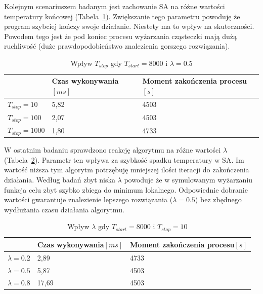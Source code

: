 Kolejnym scenariuszem badanym jest zachowanie SA na różne wartości temperatury końcowej (Tabela~\ref{tstop_sa}). Zwiększanie tego parametru powoduję że program  szybciej kończy swoje działanie. Niestety ma to wpływ na skuteczności. Powodem tego jest że pod koniec procesu wyżarzania cząsteczki mają dużą ruchliwość (duże prawdopodobieństwo znalezienia gorszego rozwiązania).
\begin{table}[H]
	\centering
	\label{tstop_sa}
	\caption{Wpływ $T_{stop}$ gdy $T_{start}=8000$ i $\lambda=0.5$}
	\begin{tabular}{lll}
		\toprule
		                & Czas wykonywania$[ms]$ & Moment zakończenia procesu$[s]$ \\
		\midrule
		$T_{stop}=10$   & 5,82                   & 4503                             \\
		$T_{stop}=100$  & 2,07                   & 4503                             \\
		$T_{stop}=1000$ & 1,80                   & 4733                             \\
		\bottomrule
	\end{tabular}
\end{table}

\newpage
W ostatnim badaniu sprawdzono reakcję algorytmu na różne wartości $\lambda$ (Tabela~\ref{lamda_sa}). Parametr ten wpływa za szybkość spadku temperatury w SA\@. Im wartość niższa tym algorytm potrzębuję mniejszej ilości iteracji do zakończenia działania.
Według badań zbyt niska $\lambda$ powoduje że w symulowanym wyżarzaniu funkcja celu zbyt szybko zbiega do minimum lokalnego.
Odpowiednie dobranie wartości gwarantuje znalezienie lepszego rozwiązania ($\lambda = 0.5$) bez zbędnego wydłużania czasu działania algorytmu.

\begin{table}[H]
	\centering
	\caption{Wpływ $\lambda$ gdy $T_{start}=8000$ i $T_{stop}=10$}
	\label{lamda_sa}
	\begin{tabular}{lll}
		\toprule
		              & Czas wykonywania$[ms]$ & Moment zakończenia procesu$[s]$ \\
		\midrule
		$\lambda=0.2$ & 2,89                   & 4733                             \\
		$\lambda=0.5$ & 5,87                   & 4503                             \\
		$\lambda=0.8$ & 17,69                  & 4503                             \\
		\bottomrule
	\end{tabular}
\end{table}

